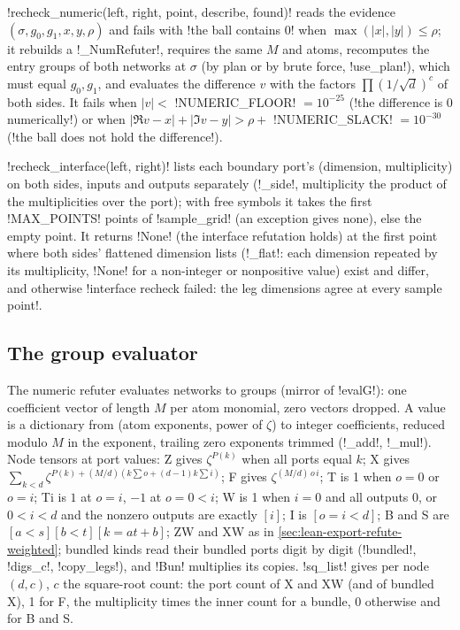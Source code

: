 {{{\lexpy!recheck_numeric(left, right, point, describe, found)! reads the evidence $(\sigma,g_0,g_1,x,y,\rho)$ and fails with \lexcode!the ball contains 0! when $\max(|x|,|y|)\le\rho$; it rebuilds a \lexpy!_NumRefuter!, requires the same $M$ and atoms, recomputes the entry groups of both networks at $\sigma$ (by plan or by brute force, \lexpy!use_plan!), which must equal $g_0,g_1$, and evaluates the difference $v$ with the factors $\prod(1/\sqrt d)^c$ of both sides. It fails when $|v|<$ \lexpy!NUMERIC_FLOOR! $=10^{-25}$ (\lexcode!the difference is 0 numerically!) or when $|\Re v-x|+|\Im v-y|>\rho+$ \lexpy!NUMERIC_SLACK! $=10^{-30}$ (\lexcode!the ball does not hold the difference!).

\lexpy!recheck_interface(left, right)! lists each boundary port's (dimension, multiplicity) on both sides, inputs and outputs separately (\lexpy!_side!, multiplicity the product of the \bbox{} multiplicities over the port); with free symbols it takes the first \lexpy!MAX_POINTS! points of \lexpy!sample_grid! (an exception gives none), else the empty point. It returns \lexpy!None! (the interface refutation holds) at the first point where both sides' flattened dimension lists (\lexpy!_flat!: each dimension repeated by its multiplicity, \lexpy!None! for a non-integer or nonpositive value) exist and differ, and otherwise \lexcode!interface recheck failed: the leg dimensions agree at every sample point!.

\subsection{The group evaluator}\label{sec:lean-export-refute-groups}

The numeric refuter evaluates networks to groups (mirror of \lexlean!evalG!): one coefficient
vector of length $M$ per atom monomial, zero vectors dropped. A value is a dictionary from
(atom exponents, power of $\zeta$) to integer coefficients, reduced modulo $M$ in the exponent,
trailing zero exponents trimmed (\lexpy!_add!, \lexpy!_mul!). Node tensors at port values: Z gives
$\zeta^{P(k)}$ when all ports equal $k$; X gives
$\sum_{k<d}\zeta^{P(k) + (M/d)(k\sum o + (d-1)k\sum i)}$; F gives $\zeta^{(M/d)\,o\,i}$; T is 1
when $o=0$ or $o=i$; Ti is $1$ at $o=i$, $-1$ at $o=0<i$; W is 1 when $i=0$ and all outputs 0,
or $0<i<d$ and the nonzero outputs are exactly $[i]$; I is $[o=i<d]$; B and S are
$[a<s][b<t][k = at+b]$; ZW and XW as in \cref{sec:lean-export-refute-weighted}; bundled kinds
read their bundled ports digit by digit (\lexpy!bundled!, \lexpy!digs_c!, \lexpy!copy_legs!), and
\lexcode!Bun! multiplies its copies. \lexpy!sq_list! gives per node $(d, c)$, $c$ the square-root
count: the port count of X and XW (and of bundled X), 1 for F, the multiplicity times the inner
count for a bundle, 0 otherwise and for B and S.

}}}
